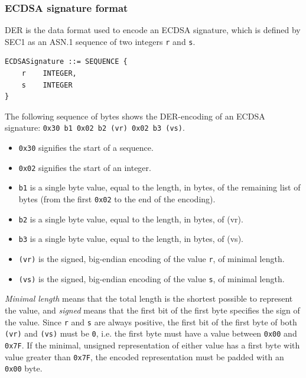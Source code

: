 \documentclass[12pt,a4paper,twoside,openright]{report}
\begin{document}
\subsubsection{ECDSA signature format}

DER is the data format used to encode an ECDSA signature, which is defined by SEC1 as an ASN.1 sequence of two integers \texttt{r} and \texttt{s}.

\begin{lstlisting}[caption={ASN.1 structure of an ECDSA signature},captionpos=b]
ECDSASignature ::= SEQUENCE {
    r    INTEGER,
    s    INTEGER
}
\end{lstlisting}

\noindent
The following sequence of bytes shows the DER-encoding of an ECDSA signature: \texttt{0x30 b1 0x02 b2 (vr) 0x02 b3 (vs)}.

\begin{itemize}
\item \texttt{0x30} signifies the start of a sequence.
\item \texttt{0x02} signifies the start of an integer.
\item \texttt{b1} is a single byte value, equal to the length, in bytes, of the remaining list of bytes (from the first \texttt{0x02} to the end of the encoding).
\item \texttt{b2} is a single byte value, equal to the length, in bytes, of (vr).
\item \texttt{b3} is a single byte value, equal to the length, in bytes, of (vs).
\item \texttt{(vr)} is the signed, big-endian encoding of the value \texttt{r}, of minimal length.
\item \texttt{(vs)} is the signed, big-endian encoding of the value \texttt{s}, of minimal length.
\end{itemize}

\noindent
\emph{Minimal length} means that the total length is the shortest possible to represent the value, and \emph{signed} means that the first bit of the first byte specifies the sign of the value. Since \texttt{r} and \texttt{s} are always positive, the first bit of the first byte of both \texttt{(vr)} and \texttt{(vs)} must be \texttt{0}, i.e. the first byte must have a value between \texttt{0x00} and \texttt{0x7F}. If the minimal, unsigned representation of either value has a first byte with value greater than \texttt{0x7F}, the encoded representation must be padded with an \texttt{0x00} byte.
\end{document}
